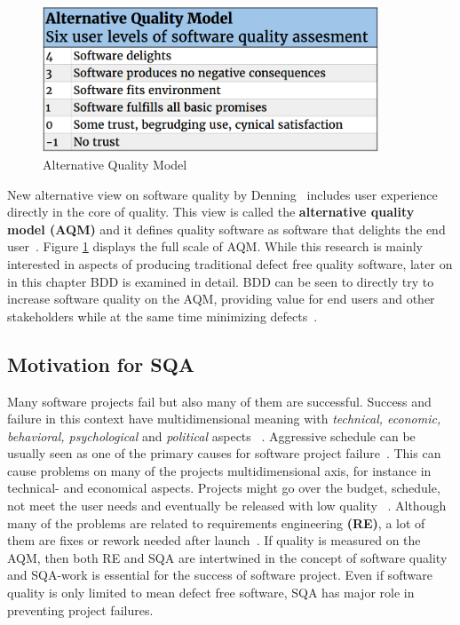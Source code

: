     \begin{figure}[ht]
      \begin{center}
        \includegraphics[width=10cm]{images/alternativeQM.png}
        \caption{Alternative Quality Model}
        \label{fig:AQM}
      \end{center}
    \end{figure}

    New alternative view on software quality by Denning~\cite{denning2016sq} includes user experience directly in the core of quality.
    This view is called the \textbf{alternative quality model (AQM)} and it defines quality software as software that delights
    the end user~\cite{denning2016sq}. Figure \ref{fig:AQM} displays the full scale of AQM.
    While this research is mainly interested in aspects of producing traditional defect free quality software,
    later on in this chapter BDD is examined in detail. BDD can be seen to directly try to increase software quality on the AQM,
    providing value for end users and other stakeholders while at the same time minimizing defects~\cite{chelimsky2010rspec}.

    \subsection{Motivation for SQA}
    Many software projects fail but also many of them are successful. Success and failure in this context have multidimensional meaning with
    \textit{technical, economic, behavioral, psychological} and \textit{political} aspects ~\cite{mcleod2011factors}. Aggressive
    schedule can be usually seen as one of the primary causes for software project failure~\cite{cerpa2009did}. This can cause
    problems on many of the projects multidimensional axis, for instance in technical- and economical aspects. Projects might go
    over the budget, schedule, not meet the user needs and eventually be released with low quality ~\cite{cerpa2009did}.
    Although many of the problems are related to requirements engineering \textbf{(RE)}, a lot of them are fixes or rework needed after launch~\cite{lessons}.
    If quality is measured on the AQM, then both RE and SQA are intertwined in the concept of software quality and SQA-work
    is essential for the success of software project. Even if software quality is only limited to mean defect free software, SQA has
    major role in preventing project failures.

